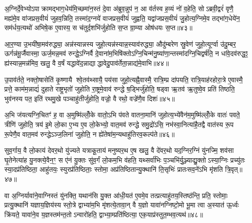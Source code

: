 {\anuvakamend[{वि वै य॒ज्ञस्साम॑ च म॒ इत्या॑ह च ति॒स्रश्चैका॒न्नप॑ञ्चा॒शच्च॑॥८॥}]}

अ॒ग्निर्दे॒वेभ्योऽपाक्रामद्भाग॒धेय॑मि॒च्छमा॑न॒स्तं दे॒वा अ॑ब्रुव॒न्नुप॑ न॒ आ व॑र्तस्व ह॒व्यं नो॑ व॒हेति॒ सोऽब्रवी॒द्वरं॑ वृणै॒ मह्य॑मे॒व वा॑जप्रस॒वीयं॑ जुहव॒न्निति॒ तस्मा॑द॒ग्नये॑ वाजप्रस॒वीयं॑ जुह्वति॒ यद्वा॑जप्रस॒वीयं॑ जु॒होत्य॒ग्निमे॒व तद्भा॑ग॒धेये॑न॒ सम॑र्धय॒त्यथो॑ अभिषे॒क ए॒वास्य॒ स च॑तुर्द॒शभि॑र्जुहोति स॒प्त ग्रा॒म्या ओष॑धयः स॒प्त॥४३॥

आ॒र॒ण्या उ॒भयी॑षा॒मव॑रुद्ध्या॒ अन्न॑स्यान्नस्य जुहो॒त्यन्न॑स्यान्न॒स्याव॑रुद्ध्या॒ औदु॑म्बरेण स्रु॒वेण॑ जुहो॒त्यूर्ग्वा उ॑दु॒म्बर॒ ऊर्गन्न॑मू॒र्जैवास्मा॒ ऊर्ज॒मन्न॒मव॑ रुन्द्धे॒ऽग्निर्वै दे॒वाना॑म॒भिषि॑क्तोऽग्नि॒चिन्म॑नु॒ष्या॑णा॒न्तस्मा॑दग्नि॒चिद्वर्\mbox{}ष॑ति॒ न धा॑वे॒दव॑रुद्ध॒ꣵ॒ ह्य॑स्यान्न॒मन्न॑मिव॒ खलु॒ वै व॒र्\mbox{}षं यद्धावे॑द॒न्नाद्याद्धावेदु॒पाव॑र्तेता॒न्नाद्य॑मे॒वाभि॥४४॥

उ॒पाव॑र्तते॒ नक्तो॒षासेति॑ कृ॒ष्णायै श्वे॒तव॑थ्सायै॒ पय॑सा जुहो॒त्यह्नै॒वास्मै॒ रात्रि॒म्प्र दा॑पयति॒ रात्रि॒याह॑रहोरा॒त्रे ए॒वास्मै॒ प्रत्ते॒ काम॑म॒न्नाद्यं॑ दुहाते राष्ट्र॒भृतो॑ जुहोति रा॒ष्ट्रमे॒वाव॑ रुन्द्धे ष॒ड्भिर्जु॑होति॒ षड्वा ऋ॒तव॑ ऋ॒तुष्वे॒व प्रति॑ तिष्ठति॒ भुव॑नस्य पत॒ इति॑ रथमु॒खे पञ्चाहु॑तीर्जुहोति॒ वज्रो॒ वै रथो॒ वज्रे॑णै॒व दिशः॑॥४५॥

अ॒भि ज॑यत्यग्नि॒चितꣳ॑ ह॒ वा अ॒मुष्मि॑ल्लोँ॒के वातो॒ऽभि प॑वते वातना॒मानि॑ जुहोत्य॒भ्ये॑वैन॑म॒मुष्मि॑ल्लोँ॒के वातः॑ पवते॒ त्रीणि॑ जुहोति॒ त्रय॑ इ॒मे लो॒का ए॒भ्य ए॒व लो॒केभ्यो॒ वात॒मव॑ रुन्द्धे समु॒द्रो॑ऽसि॒ नभ॑स्वा॒नित्या॑है॒तद्वै वात॑स्य रू॒प रू॒पेणै॒व वात॒मव॑ रुन्द्धेऽञ्ज॒लिना॑ जुहोति॒ न ह्ये॑तेषा॑म॒न्यथाहु॑तिरव॒कल्प॑ते॥४६॥

{\anuvakamend[{ओष॑धयः स॒प्ताभि दिशो॒ऽन्यथा॒ द्वे च॑॥९॥}]}

सुव॒र्गाय॒ वै लो॒काय॑ देवर॒थो यु॑ज्यते यत्राकू॒ताय॑ मनुष्यर॒थ ए॒ष खलु॒ वै दे॑वर॒थो यद॒ग्निर॒ग्निं यु॑नज्मि॒ शव॑सा घृ॒तेनेत्या॑ह यु॒नक्त्ये॒वैन॒ꣳ॒ स ए॑नं यु॒क्तः सु॑व॒र्गं लो॒कम॒भि व॑हति॒ यथ्सर्वा॑भिः प॒ञ्चभि॑र्यु॒ञ्ज्याद्यु॒क्तोऽस्या॒ग्निः प्रच्यु॑तः स्या॒दप्र॑तिष्ठिता॒ आहु॑तयः॒ स्युरप्र॑तिष्ठिताः॒ स्तोमा॒ अप्र॑तिष्ठितान्यु॒क्थानि॑ ति॒सृभिः॑ प्रातःसव॒ने॑ऽभि मृ॑शति त्रि॒वृत्॥४७॥

वा अ॒ग्निर्यावा॑ने॒वाग्निस्तं यु॑नक्ति॒ यथान॑सि यु॒क्त आ॑धी॒यत॑ ए॒वमे॒व तत्प्रत्याहु॑तय॒स्तिष्ठ॑न्ति॒ प्रति॒ स्तोमाः॒ प्रत्यु॒क्थानि॑ यज्ञाय॒ज्ञिय॑स्य स्तो॒त्रे द्वाभ्या॑म॒भि मृ॑शत्ये॒तावा॒न् वै य॒ज्ञो यावा॑नग्निष्टो॒मो भू॒मा त्वा अ॒स्यात॑ ऊ॒र्ध्वः क्रि॑यते॒ यावा॑ने॒व य॒ज्ञस्तम॑न्त॒तोऽन्वारो॑हति॒ द्वाभ्या॒म्प्रति॑ष्ठित्या॒ एक॒याप्र॑स्तुत॒म्भव॒त्यथ॑॥४८॥

